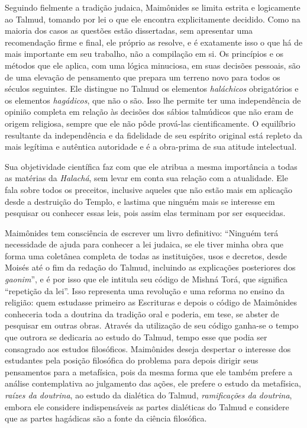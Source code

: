 Seguindo fielmente a tradição judaica, Maimônides se limita estrita e
logicamente ao Talmud, tomando por lei o que ele encontra
explicitamente decidido. Como na maioria dos casos as questões estão
dissertadas, sem apresentar uma recomendação firme e final, ele próprio
as resolve, e é exatamente isso o que há de mais importante em seu
trabalho, não a compilação em si. Os princípios e os métodos que ele
aplica, com uma lógica minuciosa, em suas decisões pessoais, são de uma
elevação de pensamento que prepara um terreno novo para todos os séculos
seguintes. Ele distingue no Talmud os elementos \emph{haláchicos}
obrigatórios e os elementos \emph{hagádicos}, que não o são. Isso lhe permite
ter uma independência de opinião completa em relação às decisões dos
sábios talmúdicos que não eram de origem religiosa, sempre que ele não
pôde prová-las cientificamente. O equilíbrio resultante da independência
e da fidelidade de seu espírito original está repleto da mais legítima
e autêntica autoridade e é a obra-prima de sua atitude intelectual.

Sua objetividade científica faz com que ele atribua a mesma importância
a todas as matérias da \emph{Halachá}, sem levar em conta sua relação com a
atualidade. Ele fala sobre todos os preceitos, inclusive aqueles que não
estão mais em aplicação desde a destruição do Templo, e lastima que
ninguém mais se interesse em pesquisar ou conhecer essas leis, pois
assim elas terminam por ser esquecidas.

Maimônides tem consciência de escrever um livro definitivo: ``Ninguém
terá necessidade de ajuda para conhecer a lei judaica, se ele tiver
minha obra que forma uma coletânea completa de todas as instituições,
usos e decretos, desde Moisés até o fim da redação do Talmud,
incluindo as explicações posteriores dos \emph{gaonim}'', e é por isso que ele
intitula seu código de Mishná Torá, que significa ``repetição da
lei''. Isso representa uma revolução e uma reforma no ensino da
religião: quem estudasse primeiro as Escrituras e depois o código de
Maimônides conheceria toda a doutrina da tradição oral e poderia, em
tese, se abster de pesquisar em outras obras. Através da utilização de
seu código ganha-se o tempo que outrora se dedicaria ao estudo do
Talmud, tempo esse que podia ser consagrado aos estudos
filosóficos. Maimônides deseja despertar o interesse dos estudantes pela
posição filosófica do problema para depois dirigir seus pensamentos para
a metafísica, pois da mesma forma que ele também prefere a análise
contemplativa ao julgamento das ações, ele prefere o estudo da
metafísica, \emph{raízes da doutrina}, ao estudo da dialética do
Talmud, \emph{ramificações da doutrina}, embora ele considere
indispensáveis as partes dialéticas do Talmud e considere que as
partes hagádicas são a fonte da ciência filosófica.


